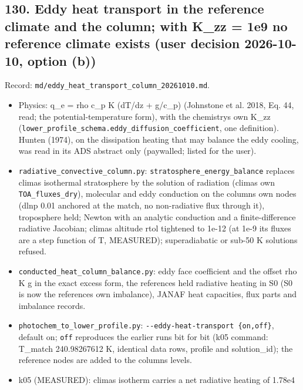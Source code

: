\documentclass[english,a4paper]{my_memo}
\providecommand{\tightlist}{\setlength{\itemsep}{0pt}\setlength{\parskip}{0pt}}
\begin{document}
\subsection{130. Eddy heat transport in the reference climate and the column; with K\_zz = 1e9 no reference climate exists (user decision 2026-10-10, option (b))}\label{130-eddy-heat-transport-in-the-reference-climate-and-the-column-with-k_zz--1e9-no-reference-climate-exists-user-decision-2026-10-10-option-b}

Record: \texttt{md/eddy\_heat\_transport\_column\_20261010.md}.

\begin{itemize}
\tightlist
\item
  Physics: q\_e = rho c\_p K (dT/dz + g/c\_p) (Johnstone et al. 2018, Eq. 44, read;
  the potential-temperature form), with the chemistry\textquotesingle s own K\_zz
  (\texttt{lower\_profile\_schema.eddy\_diffusion\_coefficient}, one definition).
  Hunten (1974), on the dissipation heating that may balance the eddy
  cooling, was read in its ADS abstract only (paywalled; listed for the
  user).
\item
  \texttt{radiative\_convective\_column.py}: \texttt{stratosphere\_energy\_balance} replaces
  clima\textquotesingle s isothermal stratosphere by the solution of radiation (clima\textquotesingle s own
  \texttt{TOA\_fluxes\_dry}), molecular and eddy conduction on the column\textquotesingle s own nodes
  (dlnp 0.01 anchored at the match, no non-radiative flux through it),
  troposphere held; Newton with an analytic conduction and a finite-difference
  radiative Jacobian; clima\textquotesingle s altitude rtol tightened to 1e-12 (at 1e-9 its
  fluxes are a step function of T, MEASURED); superadiabatic or sub-50 K
  solutions refused.
\item
  \texttt{conducted\_heat\_column\_balance.py}: eddy face coefficient and the offset
  rho K g in the exact excess form, the reference\textquotesingle s held radiative heating in
  S0 (S0 is now the reference\textquotesingle s own imbalance), JANAF heat capacities, flux
  parts and imbalance records.
\item
  \texttt{photochem\_to\_lower\_profile.py}: \texttt{-\/-eddy-heat-transport\ \{on,off\}}, default
  on; \texttt{off} reproduces the earlier runs bit for bit (k05 command: T\_match
  240.98267612 K, identical data rows, profile and solution\_id); the
  reference nodes are added to the column\textquotesingle s levels.
\item
  k05 (MEASURED): clima\textquotesingle s isotherm carries a net radiative heating of 1.78e4

\end{itemize}
\end{document}
